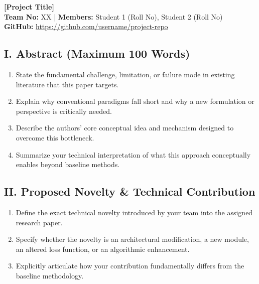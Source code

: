 \documentclass[8pt,a4paper]{article}
\begin{document}
\thispagestyle{empty}

\begin{center}

{\large\bfseries
[Project Title]}\\[4pt]

\textbf{Team No:} XX
\quad | \quad
\textbf{Members:}
Student 1 (Roll No), Student 2 (Roll No)\\[3pt]

\textbf{GitHub:}
\url{https://github.com/username/project-repo}

\end{center}

\vspace{-5pt}

\subsection*{I. Abstract (Maximum 100 Words)}
\begin{enumerate}
    \item State the fundamental challenge, limitation, or failure mode in existing literature that this paper targets.
    \item Explain why conventional paradigms fall short and why a new formulation or perspective is critically needed.
    \item Describe the authors' core conceptual idea and mechanism designed to overcome this bottleneck.
    \item Summarize your technical interpretation of what this approach conceptually enables beyond baseline methods.
\end{enumerate}

\subsection*{II. Proposed Novelty \& Technical Contribution}
\begin{enumerate}
    \item Define the exact technical novelty introduced by your team into the assigned research paper.
    \item Specify whether the novelty is an architectural modification, a new module, an altered loss function, or an algorithmic enhancement.
    \item Explicitly articulate how your contribution fundamentally differs from the baseline methodology.
\end{enumerate}
\end{document}
